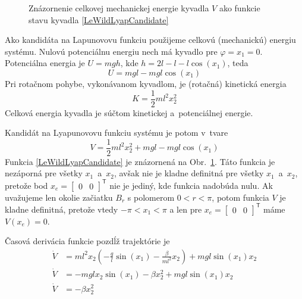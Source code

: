 \documentclass[a4paper, 10pt, ]{article}
\begin{document}
\begin{figure}[t]
	\centering
		\caption{Znázornenie celkovej mechanickej energie kyvadla $V$ ako funkcie stavu kyvadla \eqref{LeWildLyapCandidate}}
	\label{Funkcia3D}
\end{figure}







Ako kandidáta na Lapunovovu funkciu použijeme celkovú (mechanickú) energiu systému. Nulovú potenciálnu energiu nech má kyvadlo pre $\varphi = x_1 = 0$. Potenciálna energia je $U = mgh$, kde $h = 2l - l - l\cos(x_1)$, teda
\begin{equation}
	U = mgl - mgl \cos(x_1)
\end{equation}
Pri rotačnom pohybe, vykonávanom kyvadlom, je (rotačná) kinetická energia
\begin{equation}
	K = \frac{1}{2} m l^2 x_2^2
\end{equation}
Celková energia kyvadla je súčtom kinetickej a~potenciálnej energie.

Kandidát na Lyapunovovu funkciu systému je potom v~tvare
\begin{equation} \label{LeWildLyapCandidate}
	V = \frac{1}{2} m l^2 x_2^2 + mgl - mgl \cos(x_1)
\end{equation}
Funkcia \eqref{LeWildLyapCandidate} je znázornená na Obr.~\ref{Funkcia3D}. Táto funkcia je nezáporná pre všetky $x_1$~a~$x_2$, avšak nie je kladne definitná pre všetky $x_1$~a~$x_2$, pretože bod $x_e = \begin{bmatrix} 0 & 0  \end{bmatrix}^\mathsf{T}$ nie je jediný, kde funkcia nadobúda nulu. Ak uvažujeme len okolie začiatku $B_r$ s polomerom $0 < r < \pi$, potom funkcia $V$ je kladne definitná, pretože vtedy $-\pi < x_1 < \pi$ a len pre $x_e = \begin{bmatrix} 0 & 0  \end{bmatrix}^\mathsf{T}$ máme $V(x_e) = 0$.

Časová derivácia funkcie pozdĺž trajektórie je
\begin{subequations}
	\begin{align}
		\dot{V} &= m l^2 x_2 \left( -\frac{g}{l} \sin(x_1) - \frac{\beta}{ml^2} x_2 \right) + mgl \sin(x_1) x_2 \\
		\dot{V} &= - m g l x_2 \sin(x_1) - \beta x_2^2 + mgl \sin(x_1) x_2 \\
		\dot{V} &=  - \beta x_2^2
	\end{align}
\end{subequations}
\end{document}
